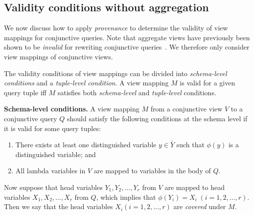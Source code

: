 \subsection{Validity conditions without aggregation}\label{valid_condition_no_agg}

We now discuss how to apply {\em provenance} to determine the validity of view mappings for conjunctive queries.
Note that aggregate views have previously been shown to be \textit{invalid} for rewriting conjunctive queries~\cite{srivastava1996answering}. We therefore only consider view mappings of conjunctive views.

The validity conditions of view mappings can be divided into {\em schema-level conditions} and a {\em tuple-level condition}. A view mapping $M$ is valid for a given query tuple iff $M$ satisfies both {\em schema-level} and {\em tuple-level} conditions. 

\begin{definition}\label{definition:token mapping}
{\bf Schema-level conditions.}
A view mapping $M$ from a conjunctive view $V$ to a conjunctive query $Q$ should satisfy the following conditions at the schema level if it is valid for some query tuples:
\begin{enumerate}
\item There exists at least one distinguished variable $y \in \bar{Y}$ such that $\phi(y)$ is a distinguished variable; and
\item All lambda variables in $V$ are mapped to variables in the body of $Q$.
\end{enumerate}
\end{definition}

Now suppose that head variables $Y_1, Y_2, \dots, Y_r$ from $V$ are mapped to head variables $X_1, X_2, \dots, X_r$ from $Q$, which implies that $\phi(Y_i) = X_i \;(i=1,2,\dots, r)$. Then we say that the head variables $X_i (i=1,2,\dots, r)$ are {\em covered} under $M$.


